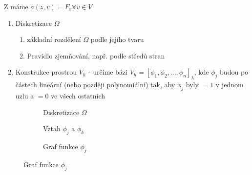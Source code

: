 \documentclass[../main.tex]{subfiles}
\begin{document}
Z  máme $a(z,v) = F_v \forall v \in V$ 


\begin{enumerate}
    \item Diskretizace $\Omega$ 
    \begin{enumerate}
        \item základní rozdělení $\Omega$ podle jejího tvaru
        \item Pravidlo zjemňování, např. podle středů stran
    \end{enumerate}
    \item Konstrukce prostrou $V_h$ - určíme bázi $V_h =  [\phi_1, \phi_2, ... , \phi_n ]_\lambda$, kde $\phi_j$ budou po částech lineární (nebo později polynomiální) tak, aby $\phi_j$ byly $=1$ v jednom uzlu a $=0$ ve všech ostatních
\end{enumerate}


\begin{figure}
    \centering
    \begin{subfigure}[b]{0.3\textwidth}
        \centering
        \begin{tikzpicture}



        \end{tikzpicture}
        \caption{Diskretizace $\Omega$}
    \end{subfigure}
    \hfill
    \begin{subfigure}[b]{0.3\textwidth}
        \centering
        \caption{Vztah $\phi_j$ a $\phi_k$}
    \end{subfigure}
    \hfill
    \begin{subfigure}[b]{0.3\textwidth}
        \centering
        \caption{Graf funkce $\phi_j$}
    \end{subfigure}
\end{figure}
\end{document}
